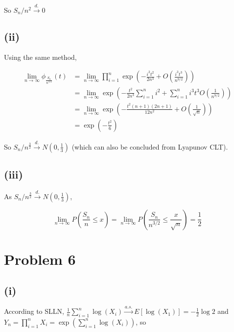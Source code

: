 \documentclass{article}
\begin{document}
So $S_n/n^2 \overset{d.}{\to} 0$

\subsection{(ii)}

Using the same method,

\begin{equation}
    \begin{aligned}
        \lim_{n\to \infty}\phi_{\frac{S_n}{n^{3/2}}} (t) & =  \lim_{n\to \infty}\prod_{i=1}^n \exp \left({-\frac{i^2t^2}{2n^3} + O(\frac{i^3t^3}{n^{9/2}})}\right) \\
        & = \lim_{n\to \infty} \exp \left({-\frac{t^2}{2n^3}\sum_{i=1}^n i^2 + \sum_{i=1}^n i^3t^3 O(\frac{1}{n^{9/2}})}\right) \\
        & = \lim_{n\to \infty} \exp \left({-\frac{t^2(n+1)(2n+1)}{12n^2} +  O(\frac{1}{\sqrt{n}})}\right) \\
        & = \exp\left(-\frac{t^2}{6}\right)
    \end{aligned}
\end{equation}

So $S_n/n^{\frac{3}{2}} \overset{d.}{\to} N(0,\frac{1}{3})$ (which can also be concluded from Lyapunov CLT).


\subsection{(iii)}


As $S_n/n^{\frac{3}{2}} \overset{d.}{\to} N(0,\frac{1}{3})$, 

\begin{equation}
    \lim_{n \to \infty} P(\frac{S_n}{n} \leqslant x) = \lim_{n \to \infty} P(\frac{S_n}{n^{3/2}} \leqslant \frac{x}{\sqrt{n}})  = \frac{1}{2}
\end{equation}

\section{Problem 6}

\subsection{(i)}

According to SLLN, $ \frac{1}{n}\sum\limits_{i=1}^n \log (X_i) \overset{a.s.}{\to} E[\log(X_1)] = -\frac{1}{2} \log2$ and
$Y_n = \prod\limits_{i=1}^n X_i = \exp\left(\sum\limits_{i=1}^n \log (X_i)\right)$, so 
\end{document}

